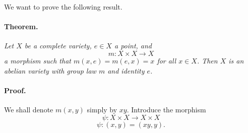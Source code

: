 We want to prove the following result.

\paragraph{Theorem.}
\textit{Let $X$ be a complete variety, $e \in X$ a point, and}
\[
  m : X \times X \longrightarrow X
\]
\textit{a morphism such that $m(x, e) = m(e, x) = x$ for all $x \in X$. Then
$X$ is an abelian variety with group law $m$ and identity $e$.}

\paragraph{Proof.}
We shall denote $m(x, y)$ simply by $xy$. Introduce the morphism
\[
  \psi : X \times X \longrightarrow X \times X
\]
\[
  \psi : (x, y) = (xy, y).
\]
